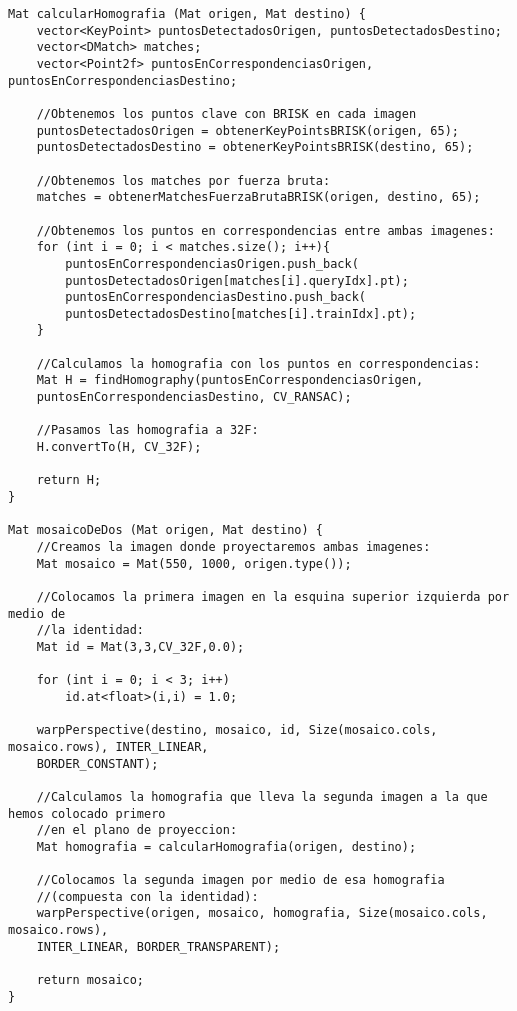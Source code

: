 \documentclass[10pt,a4paper]{article}
\begin{document}
\begin{lstlisting}
Mat calcularHomografia (Mat origen, Mat destino) {
	vector<KeyPoint> puntosDetectadosOrigen, puntosDetectadosDestino;
	vector<DMatch> matches;
	vector<Point2f> puntosEnCorrespondenciasOrigen, puntosEnCorrespondenciasDestino;
	
	//Obtenemos los puntos clave con BRISK en cada imagen
	puntosDetectadosOrigen = obtenerKeyPointsBRISK(origen, 65);
	puntosDetectadosDestino = obtenerKeyPointsBRISK(destino, 65);
	
	//Obtenemos los matches por fuerza bruta:
	matches = obtenerMatchesFuerzaBrutaBRISK(origen, destino, 65);
	
	//Obtenemos los puntos en correspondencias entre ambas imagenes:
	for (int i = 0; i < matches.size(); i++){
		puntosEnCorrespondenciasOrigen.push_back(
		puntosDetectadosOrigen[matches[i].queryIdx].pt);
		puntosEnCorrespondenciasDestino.push_back(
		puntosDetectadosDestino[matches[i].trainIdx].pt);	
	}
	
	//Calculamos la homografia con los puntos en correspondencias:	
	Mat H = findHomography(puntosEnCorrespondenciasOrigen,
	puntosEnCorrespondenciasDestino, CV_RANSAC);
	
	//Pasamos las homografia a 32F:
	H.convertTo(H, CV_32F);
	
	return H;
}

Mat mosaicoDeDos (Mat origen, Mat destino) {
	//Creamos la imagen donde proyectaremos ambas imagenes:
	Mat mosaico = Mat(550, 1000, origen.type());
		
	//Colocamos la primera imagen en la esquina superior izquierda por medio de 
	//la identidad:
	Mat id = Mat(3,3,CV_32F,0.0);
	
	for (int i = 0; i < 3; i++)
		id.at<float>(i,i) = 1.0;
		
	warpPerspective(destino, mosaico, id, Size(mosaico.cols, mosaico.rows), INTER_LINEAR,
	BORDER_CONSTANT);
	
	//Calculamos la homografia que lleva la segunda imagen a la que hemos colocado primero
	//en el plano de proyeccion:
	Mat homografia = calcularHomografia(origen, destino);
	
	//Colocamos la segunda imagen por medio de esa homografia
	//(compuesta con la identidad):
	warpPerspective(origen, mosaico, homografia, Size(mosaico.cols, mosaico.rows),
	INTER_LINEAR, BORDER_TRANSPARENT);
	
	return mosaico;	
}

\end{lstlisting}
\end{document}
